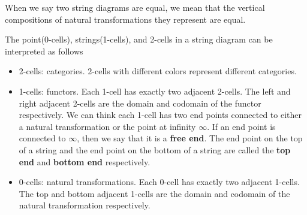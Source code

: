 \begin{center}
    \hspace{1cm}
\end{center}

When we say two string diagrams are equal, we mean that the vertical compositions of natural transformations they represent are equal.

The point(0-cells), strings(1-cells), and 2-cells in a string diagram can be interpreted as follows
\begin{itemize}
    \item 2-cells: categories. 2-cells with different colors represent different categories.
    \item 1-cells: functors. Each 1-cell has exactly two adjacent 2-cells. The left and right adjacent 2-cells are the domain and codomain of the functor respectively. We can think each 1-cell has two end points connected to either a natural transformation or the point at infinity $\infty$. If an end point is connected to $\infty$, then we say that it is a \textbf{free end}. The end point on the top of a string and the end point on the bottom of a string are called the \textbf{top end} and \textbf{bottom end} respectively.
    \item 0-cells: natural transformations. Each 0-cell has exactly two adjacent 1-cells. The top and bottom adjacent 1-cells are the domain and codomain of the natural transformation respectively. 
\end{itemize}


